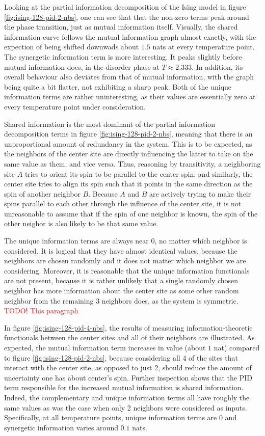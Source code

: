 \documentclass[12pt]{article}
\begin{document}
Looking at the partial information decomposition of the Ising model in figure \ref{fig:ising-128-pid-2-nbs}, one can see that that the non-zero terms peak around the phase transition, just as mutual information itself. Visually, the shared information curve follows the mutual information graph almost exactly, with the expection of being shifted downwads about $1.5$ nats at every temperature point. The synergetic information term is more interesting. It peaks slightly before mutual information does, in the disorder phase at $T \approx 2.333$. In addition, its overall behaviour also deviates from that of mutual information, with the graph being quite a bit flatter, not exhibiting a sharp peak. Both of the unique information terms are rather uninteresting, as their values are essentially zero at every temperature point under consideration. 

Shared information is the most dominant of the partial information decomposition terms in figure \ref{fig:ising-128-pid-2-nbs}, meaning that there is an unproportional amount of redundancy in the system. This is to be expected, as the neighbors of the center site are directly influencing the latter to take on the same value as them, and vice versa. Thus, reasoning by transitivity, a neighboring site $A$ tries to orient its spin to be parallel to the center spin, and similarly, the center site tries to align its spin such that it points in the same direction as the spin of another neighbor $B$. Because $A$ and $B$ are actively trying to make their spins parallel to each other through the influence of the center site, it is not unreasonable to assume that if the spin of one neighbor is known, the spin of the other neighor is also likely to be that same value. 

The unique information terms are always near 0, no matter which neighbor is considered. It is logical that they have almost identical values, because the neighbors are chosen randomly and it does not matter which neighbor we are considering. Moreover, it is reasonable that the unique information functionals are not present, because it is rather unlikely that a single randomly chosen neighbor has more information about the center site as some other random neighbor from the remaining 3 neighbors does, as the system is symmetric. \textcolor{red}{TODO! This paragraph}

In figure \ref{fig:ising-128-pid-4-nbs}, the results of measuring information-theoretic functionals between the center sites and all of their neighbors are illustrated. As expected, the mutual information term increases in value (about $1$ nat) compared to figure \ref{fig:ising-128-pid-2-nbs}, because considering all 4 of the sites that interact with the center site, as opposed to just 2, should reduce the amount of uncertainty one has about center's spin. Further inspection shows that the PID term responsible for the increased mutual information is shared information. Indeed, the complementary and unique information terms all have roughly the same values as was the case when only 2 neighbors were considered as inputs. Specifically, at all temperature points, unique information terms are $0$ and synergetic information varies around $0.1$ nats. 
\end{document}
